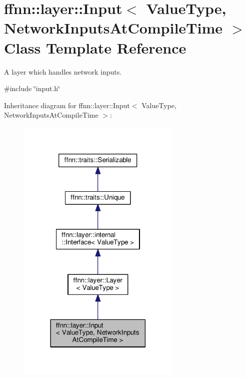 \hypertarget{classffnn_1_1layer_1_1_input}{\section{ffnn\-:\-:layer\-:\-:Input$<$ Value\-Type, Network\-Inputs\-At\-Compile\-Time $>$ Class Template Reference}
\label{classffnn_1_1layer_1_1_input}
}


A layer which handles network inputs.  




{\ttfamily \#include \char`\"{}input.\-h\char`\"{}}



Inheritance diagram for ffnn\-:\-:layer\-:\-:Input$<$ Value\-Type, Network\-Inputs\-At\-Compile\-Time $>$\-:
\nopagebreak
\begin{figure}[H]
\begin{center}
\leavevmode
\includegraphics[width=222pt]{classffnn_1_1layer_1_1_input__inherit__graph}
\end{center}
\end{figure}


